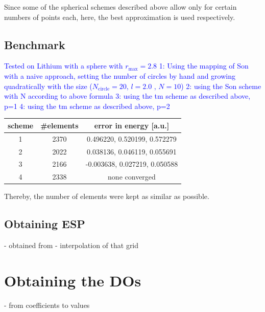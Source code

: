 Since some of the spherical schemes described above allow only for certain numbers of points each, here, the best approximation is used respectively.

\subsection{Benchmark}
\textcolor{blue}{
Tested on Lithium with a sphere with $r_\text{max}=2.8$
1:  Using the mapping of Son with a naive approach, setting the number of circles by hand and growing quadratically with the size  ($N_\text{circle}=20$, $l= 2.0$ , $N= 10$)
2: using the Son scheme with N according to above formula
3: using the tm scheme as described above, p=1
4: using the tm scheme as described above, p=2}

\begin{tabular}{|c|c|c|}
\hline
scheme & \#elements & error in energy [a.u.]\\
\hline
1      & 2370      & 0.496220, 0.520199, 0.572279 \\
2      & 2022      & 0.038136, 0.046119, 0.055691 \\
3      & 2166      &-0.003638, 0.027219, 0.050588 \\
4      & 2338      & none converged \\
\hline
\end{tabular}
Thereby, the number of elements were kept as similar as possible.

\subsection{Obtaining ESP}
 - obtained from 
 - interpolation of that grid

\section{Obtaining the DOs}
 - from coefficients to values
